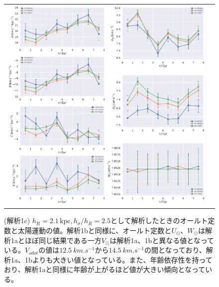 \begin{figure}
   \centering
\begin{tabular}{cc}
\includegraphics[width=16cm]{fig/1c.pdf}
\end{tabular}
    \caption{(解析1c) $h_R=2.1\,\mathrm{kpc}, h_{\sigma}/h_R=2.5$として解析したときのオールト定数と太陽運動の値。解析1bと同様に、オールト定数と$U_{\odot}、W_{\odot}$は解析1aとほぼ同じ結果である一方$V_{\odot}$は解析1a、1bと異なる値となっている。$V_{odot}$の値は$\SI{12.5}{km.s^{-1}}$から$\SI{14.5}{km.s^{-1}}$の間となっており、解析1a、1bよりも大きい値となっている。また、年齢依存性を持っており、解析1aと同様に年齢が上がるほど値が大きい傾向となっている。}
    \label{figObs1c}
\end{figure}

